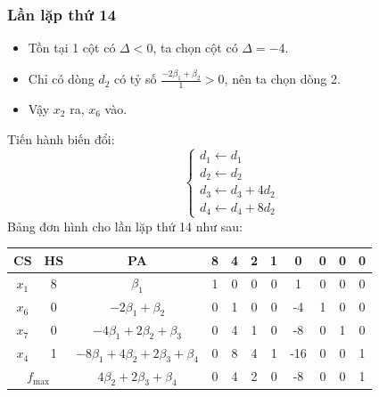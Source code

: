 \documentclass[12pt]{article}
\begin{document}
\subsubsection{Lần lặp thứ 14}
\begin{itemize}
\item Tồn tại 1 cột có $\Delta < 0$, ta chọn cột có $\Delta = -4$.
\item Chỉ có dòng $d_2$ có tỷ số $\displaystyle \frac{-2\beta_1 + \beta_2}{1} > 0$, nên ta chọn dòng 2.
\item Vậy $x_2$ ra, $x_6$ vào.
\end{itemize}
Tiến hành biến đổi:
$$
\left\{
\begin{array}{lll}
d_1 \leftarrow d_1 \\
d_2 \leftarrow d_2\\
d_3 \leftarrow d_3 + 4d_2\\
d_4 \leftarrow d_4 + 8d_2
\end{array}
\right.
$$
Bảng đơn hình cho lần lặp thứ 14 như sau:
\begin{table}[H]
\centering
\begin{tabular}{|c|c|c|c|c|c|c|c|c|c|c|}
\hline
CS & HS & PA & 8 & 4 & 2 & 1 & 0 & 0 & 0 & 0 \\
\hline
$x_1$ & 8 & $\beta_1$ & 1 & 0 & 0 & 0 & 1 & 0 & 0 & 0 \\
$x_6$ & 0 & $-2\beta_1 + \beta_2$ & 0 & 1 & 0 & 0 & -4 & 1 & 0 & 0 \\
$x_7$ & 0 & $-4\beta_1 + 2\beta_2 + \beta_3$ & 0 & 4 & 1 & 0 & -8 & 0 & 1 & 0 \\
$x_4$ & 1 & $-8\beta_1 + 4\beta_2 + 2\beta_3 + \beta_4$ & 0 & 8 & 4 & 1 & -16 & 0 & 0 & 1 \\
\hline
\multicolumn{2}{|c|}{$f_{\max}$}
& $4\beta_2 + 2\beta_3 + \beta_4$ & 0 & 4 & 2 & 0 & -8 & 0 & 0 & 1 \\
\hline
\end{tabular}
\end{table}
\end{document}
